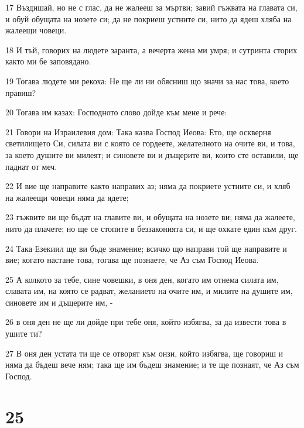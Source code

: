 \par 17 Въздишай, но не с глас, да не жалееш за мъртви; завий гъжвата на главата си, и обуй обущата на нозете си; да не покриеш устните си, нито да ядеш хляба на жалеещи човеци.
\par 18 И тъй, говорих на людете заранта, а вечерта жена ми умря; и сутринта сторих както ми бе заповядано.
\par 19 Тогава людете ми рекоха: Не ще ли ни обясниш що значи за нас това, което правиш?
\par 20 Тогава им казах: Господното слово дойде към мене и рече:
\par 21 Говори на Израилевия дом: Така казва Господ Иеова: Ето, ще оскверня светилището Си, силата ви с която се гордеете, желателното на очите ви, и това, за което душите ви милеят; и синовете ви и дъщерите ви, които сте оставили, ще паднат от меч.
\par 22 И вие ще направите както направих аз; няма да покриете устните си, и хляб на жалеещи човеци няма да ядете;
\par 23 гъжвите ви ще бъдат на главите ви, и обущата на нозете ви; няма да жалеете, нито да плачете; но ще се стопите в беззаконията си, и ще охкате един към друг.
\par 24 Така Езекиил ще ви бъде знамение; всичко що направи той ще направите и вие; когато настане това, тогава ще познаете, че Аз съм Господ Иеова.
\par 25 А колкото за тебе, сине човешки, в оня ден, когато им отнема силата им, славата им, на която се радват, желанието на очите им, и милите на душите им, синовете им и дъщерите им, -
\par 26 в оня ден не ще ли дойде при тебе оня, който избягва, за да извести това в ушите ти?
\par 27 В оня ден устата ти ще се отворят към онзи, който избягва, ще говориш и няма да бъдеш вече ням; така ще им бъдеш знамение; и те ще познаят, че Аз съм Господ.

\chapter{25}

